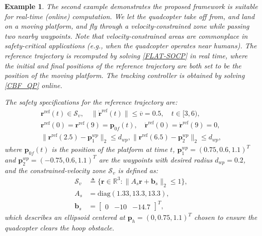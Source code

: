 \documentclass[journal,10pt]{IEEEtran}
\newtheorem{example}{\bfseries Example}%
\newcommand{\vect}[1]{\boldsymbol{\mathbf{#1}}}
\newcommand{\mat}[1]{\begin{bmatrix} #1 \end{bmatrix}}
\begin{document}
\begin{example}\label{example:slowzone}
The second example  demonstrates the proposed framework is suitable for real-time (online) computation.
We let the quadcopter take off from, and land on a moving platform, and fly through a velocity-constrained zone while passing two nearby waypoints. Note that velocity-constrained areas are commonplace  in  safety-critical applications (e.g., when the quadcopter operates near humans). The reference trajectory is recomputed by solving \eqref{FLAT-SOCP} in real time, where the initial and final positions of the reference trajectory are both set to be the position of the moving platform. The tracking controller is obtained by solving \eqref{CBF_QP} online.

The safety specifications for the reference trajectory are: 
\begin{subequations} \label{slowzone_specs}
\begin{align}
    \vect{r}^{\text{ref}}(t) \in \mathcal{S}_v, \quad
    \|\dot{\vect{r}}^{\text{ref}}(t)\| \leq \overline{v} = 0.5, \quad t\in[3,6),\label{slowzone_specs_local}\\
    \vect{r}^{\text{ref}}(0) =  \vect{r}^{\text{ref}}(9) = \vect{p}_{0f}(t), \quad \dot{\vect{r}}^{\text{ref}}(0) = \dot{\vect{r}}^{\text{ref}}(9) = 0,\label{slowzone_specs_ext} \\
    \|\vect{r}^{\text{ref}}(2.5) - \vect{p}_1^{wp}\|_2\leq d_{wp},\|\vect{r}^{\text{ref}}(6.5) - \vect{p}_2^{wp}\|_2\leq d_{wp}\label{slowzone_specs_wp},
\end{align}
\end{subequations}
where $\vect{p}_{0f}(t)$ is the position of the platform at time $t$, $\vect{p}_1^{wp} = (0.75, 0.6, 1.1)^T$ and $\vect{p}_2^{wp} = (-0.75,0.6,1.1)^T$ are the waypoints with desired radius $d_{wp} = 0.2$, and the constrained-velocity zone $\mathcal{S}_v$ is defined as: 
\begin{align*}
    \mathcal{S}_{v}&\triangleq \{\vect{r}\in\mathbb{R}^3: \|A_s\vect{r}+\vect{b}_s\|_2\leq 1\}, \label{ex2_local_specification} \\
    A_s&=\text{diag}(1.33, 13.3, 13.3),\\
    \vect{b}_s &= \mat{0& -10& -14.7}^T,
\end{align*}
which describes an ellipsoid centered at $\vect{p}_h = (0,0.75,1.1)^T$ chosen to ensure the quadcopter clears the \emph{hoop} obstacle.


\end{example}
\end{document}
